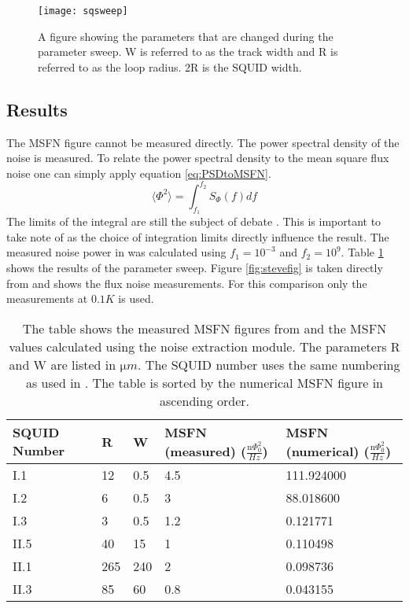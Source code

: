 \begin{figure}[H]
    \centering
    \texttt{[image: sqsweep]}
    \caption{A figure showing the parameters that are changed during the parameter sweep. W is referred to as the track width and R is referred to as the loop radius. 2R is the SQUID width.}
    \label{fig:sqsweep}
\end{figure}
\subsection{Results}
The MSFN figure cannot be measured directly. The power spectral density of the noise is measured. To relate the power spectral density to the mean square flux noise one can simply apply equation \ref{eq:PSDtoMSFN}.
\begin{equation}
    \langle \Phi^2 \rangle = \int_{f_1}^{f_2}S_\Phi (f) df
    \label{eq:PSDtoMSFN}
\end{equation} 
The limits of the integral are still the subject of debate \cite{fluxNoiseSquidsStevenAnton}. This is important to take note of as the choice of integration limits directly influence the result. The measured noise power in \cite{fluxNoiseSquidsStevenAnton} was calculated using $f_1 = 10^{-3}$ and $f_2 = 10^9$. Table \ref{tab:sweepres} shows the results of the parameter sweep. Figure \ref{fig:stevefig} is taken directly from \cite{fluxNoiseSquidsStevenAnton} and shows the flux noise measurements. For this comparison only the measurements at $0.1 K$ is used. 
\begin{table}[H]
    \centering   
    \begin{tabular}{lllll}
        \hline
        SQUID Number & R & W & MSFN (measured) ($\frac{\si{\nano}\Phi_0^2}{Hz}$) & MSFN (numerical) ($\frac{\si{\nano}\Phi_0^2}{Hz}$)\\ \hline
        I.1 & 12 & 0.5 & 4.5 & 111.924000 \\
        I.2 & 6 & 0.5 & 3 & 88.018600 \\
        I.3 & 3 & 0.5 & 1.2 & 0.121771 \\
        II.5 & 40 & 15 & 1 & 0.110498 \\
        II.1 & 265 & 240 & 2 & 0.098736 \\
        II.3 & 85 & 60 & 0.8 & 0.043155 \\ \hline
    \end{tabular}
    \caption{The table shows the measured MSFN figures from \cite{fluxNoiseSquidsStevenAnton} and the MSFN values calculated using the noise extraction module. The parameters R and W are listed in $\si{\micro m}$. The SQUID number uses the same numbering as used in \cite{fluxNoiseSquidsStevenAnton}. The table is sorted by the numerical MSFN figure in ascending order.}
    \label{tab:sweepres}
\end{table}

